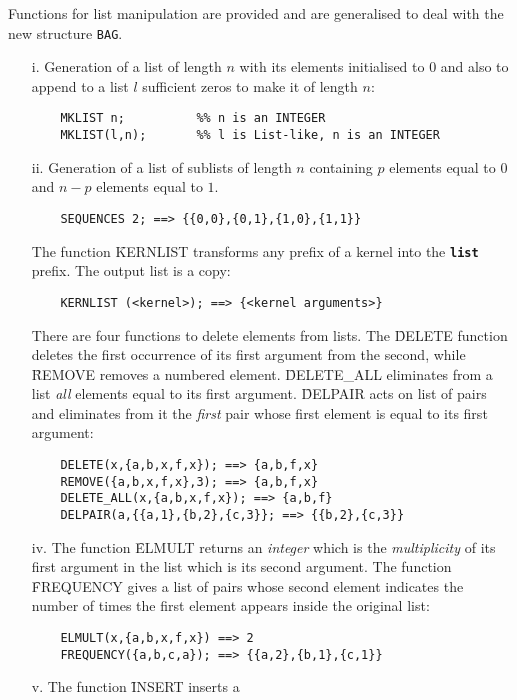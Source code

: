 Functions for list manipulation are provided and are generalised
to deal with the new structure {\tt BAG}.
\begin{itemize}
\item[i.]
Generation of a list of length $n$ with its elements initialised to 0
and also to append to a list $l$ sufficient zeros to
make it of length $n$:
\begin{verbatim}
	MKLIST n;          %% n is an INTEGER
	MKLIST(l,n);       %% l is List-like, n is an INTEGER
\end{verbatim}

\item[ii.]
Generation of a list of sublists of length $n$ containing $p$ elements
equal to $0$ and $n-p$ elements equal to $1$.
\begin{verbatim}
	SEQUENCES 2; ==> {{0,0},{0,1},{1,0},{1,1}}
\end{verbatim}
The function \f{KERNLIST} transforms any prefix of
a kernel into the {\bf \verb+list+} prefix.  The output list is a copy:
\begin{verbatim}
	KERNLIST (<kernel>); ==> {<kernel arguments>}
\end{verbatim}
There are four functions to delete elements from lists.  The
\f{DELETE} function deletes the first occurrence of its first argument
from the second, while \f{REMOVE} removes a numbered element.
\f{DELETE\_ALL} eliminates from a list {\em all} elements equal to its
first argument.  \f{DELPAIR} acts on list of pairs and eliminates from
it the {\em first} pair whose first element is equal to its first
argument:
\begin{verbatim}
	DELETE(x,{a,b,x,f,x}); ==> {a,b,f,x}
	REMOVE({a,b,x,f,x},3); ==> {a,b,f,x}
	DELETE_ALL(x,{a,b,x,f,x}); ==> {a,b,f}
	DELPAIR(a,{{a,1},{b,2},{c,3}}; ==> {{b,2},{c,3}}
\end{verbatim}
\item[iv.]
The function \f{ELMULT} returns an {\em integer} which is the
{\em multiplicity} of its first argument in the list which is its
second argument.
The function \f{FREQUENCY} gives a list of pairs
whose second element indicates the number of times the first element
appears inside the original list:
\begin{verbatim}
	ELMULT(x,{a,b,x,f,x}) ==> 2
	FREQUENCY({a,b,c,a}); ==> {{a,2},{b,1},{c,1}}
\end{verbatim}
\item[v.]  The function \f{INSERT} inserts a

\end{itemize}
